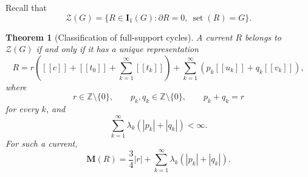 \documentclass[11pt]{article}
\newtheorem{theorem}{Theorem}[section]
\theoremstyle{remark}
\newcommand{\M}{\mathbf M}
\newcommand{\I}{\mathbf I}
\newcommand{\set}{\operatorname{set}}
\newcommand{\llbracket}{[\![}
\newcommand{\rrbracket}{]\!]}
\begin{document}
Recall that
\[
 \mathscr Z(G)=\{R\in\I_1(G):\partial R=0,\ \set(R)=G\}.
\]

\begin{theorem}[Classification of full-support cycles]\label{thm:cycle-classification}
A current $R$ belongs to $\mathscr Z(G)$ if and only if it has a unique representation
\begin{equation}\label{eq:cycle-classification}
 R=r\left(
       \llbracket c\rrbracket+\llbracket t_0\rrbracket
       +\sum_{k=1}^{\infty}\llbracket t_k\rrbracket
      \right)
   +\sum_{k=1}^{\infty}
      \left(p_k\llbracket u_k\rrbracket
            +q_k\llbracket v_k\rrbracket\right),
\end{equation}
where
\begin{equation}\label{eq:cycle-coefficients}
 r\in\mathbb Z\setminus\{0\},
 \qquad
 p_k,q_k\in\mathbb Z\setminus\{0\},
 \qquad
 p_k+q_k=r
\end{equation}
for every $k$, and
\begin{equation}\label{eq:cycle-summability}
 \sum_{k=1}^{\infty}\lambda_k
       (|p_k|+|q_k|)<\infty.
\end{equation}
For such a current,
\begin{equation}\label{eq:cycle-mass}
       \M(R)=\frac34|r|
       +\sum_{k=1}^{\infty}\lambda_k(|p_k|+|q_k|).
\end{equation}
\end{theorem}
\end{document}
